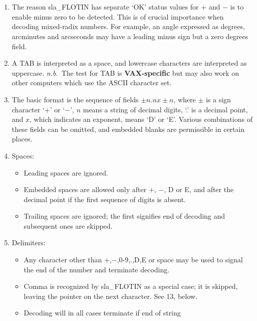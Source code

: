 {
  \\
  \\
}
\notes
{
 \begin{enumerate}
 \item The reason sla\_FLOTIN has separate `OK' status values
       for + and $-$ is to enable minus zero to be detected.
       This is of crucial importance
       when decoding mixed-radix numbers.  For example, an angle
       expressed as degrees, arcminutes and arcseconds may have a
       leading minus sign but a zero degrees field.
 \item A TAB is interpreted as a space, and lowercase characters are
       interpreted as uppercase.  {\it n.b.}\ The test for TAB is
       {\bf VAX-specific} but may also work on other computers
       which use the ASCII character set.
 \item The basic format is the sequence of fields $\pm n.n x \pm n$,
       where $\pm$ is a sign
       character `+' or `$-$', $n$ means a string of decimal digits,
       `.' is a decimal point, and $x$, which indicates an exponent,
       means `D' or `E'.  Various combinations of these fields can be
       omitted, and embedded blanks are permissible in certain places.
 \item Spaces:
       \begin{itemize}
       \item Leading spaces are ignored.
       \item Embedded spaces are allowed only after +, $-$, D or E,
             and after the decimal point if the first sequence of
             digits is absent.
       \item Trailing spaces are ignored;  the first signifies
             end of decoding and subsequent ones are skipped.
       \end{itemize}
 \item Delimiters:
       \begin{itemize}
       \item Any character other than +,$-$,0-9,.,D,E or space may be
             used to signal the end of the number and terminate decoding.
       \item Comma is recognized by sla\_FLOTIN as a special case; it
             is skipped, leaving the pointer on the next character.  See
             13, below.
       \item Decoding will in all cases terminate if end of string

\end{itemize}
\end{enumerate}}
